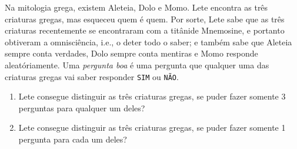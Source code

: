 Na mitologia grega, existem Aleteia, Dolo e Momo. Lete encontra as três criaturas gregas, mas esqueceu quem é quem. Por sorte, Lete sabe que as três criaturas recentemente se encontraram com a titânide Mnemosine, e portanto obtiveram a omnisciência, i.e., o deter todo o saber; e também sabe que Aleteia sempre conta verdades, Dolo sempre conta mentiras e Momo responde aleatóriamente. Uma \emph{pergunta boa} é uma pergunta que qualquer uma das criaturas gregas vai saber responder \texttt{SIM} ou \texttt{NÃO}.

\begin{enumerate}[label = (\alph*)]
	\item Lete consegue distinguir as três criaturas gregas, se puder fazer somente 3 perguntas para qualquer um deles?
	\item Lete consegue distinguir as três criaturas gregas, se puder fazer somente 1 pergunta para cada um deles?
\end{enumerate}
